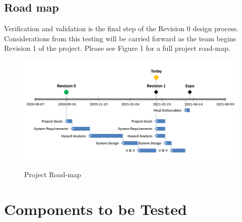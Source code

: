 \documentclass[12pt]{article}
\begin{document}
\subsection{Road map}
Verification and validation is the final step of the Revision 0 design process. Considerations from this testing will be carried forward as the team begins Revision 1 of the project. Please see Figure 1 for a full project road-map.

\begin{figure}[H]
  \centering
  \includegraphics[width=\linewidth]{V_V/Roadmap.PNG}
  \caption{Project Road-map}
\end{figure}


\section{Components to be Tested}
\end{document}
